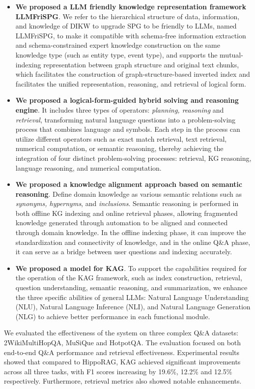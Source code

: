 \documentclass{article}
\begin{document}
   \begin{itemize}
       \item \textbf{We proposed a LLM friendly knowledge representation framework LLMFriSPG}. We refer to the hierarchical structure of data, information, and knowledge of DIKW to upgrade SPG to be friendly to LLMs, named LLMFriSPG, to make it compatible with schema-free information extraction and schema-constrained expert knowledge construction on the same knowledge type (such as entity type, event type), and supports the mutual-indexing representation between graph structure and original text chunks, which facilitates the construction of graph-structure-based inverted index and facilitates the unified representation, reasoning, and retrieval of logical form.
       \item \textbf{We proposed a logical-form-guided hybrid solving and reasoning engine}. It includes three types of operators: \textit{planning, reasoning} and \textit{retrieval}, transforming natural language questions into a problem-solving process that combines language and symbols. Each step in the process can utilize different operators such as exact match retrieval, text retrieval, numerical computation, or semantic reasoning, thereby achieving the integration of four distinct problem-solving processes: retrieval, KG reasoning, language reasoning, and numerical computation.
       \item \textbf{We proposed a knowledge alignment approach based on semantic reasoning}. Define domain knowledge as various semantic relations such as \textit{synonyms, hypernyms}, and \textit{inclusions}. Semantic reasoning is performed in both offline KG indexing and online retrieval phases, allowing fragmented knowledge generated through automation to be aligned and connected through domain knowledge. In the offline indexing phase, it can improve the standardization and connectivity of knowledge, and in the online Q\&A phase, it can serve as a bridge between user questions and indexing accurately.
       \item \textbf{We proposed a model for KAG}. To support the capabilities required for the operation of the KAG framework, such as index construction, retrieval, question understanding, semantic reasoning, and summarization, we enhance the three specific abilities of general LLMs: Natural Language Understanding (NLU), Natural Language Inference (NLI), and Natural Language Generation (NLG) to achieve better performance in each functional module.
   \end{itemize}
We evaluated the effectiveness of the system on three complex Q\&A datasets: 2WikiMultiHopQA\cite{2wiki}, MuSiQue\cite{musique} and HotpotQA\cite{hotpotqa}. The evaluation focused on both end-to-end Q\&A performance and retrieval effectiveness. Experimental results showed that compared to HippoRAG\cite{gutierrez2024hipporag}, KAG achieved significant improvements across all three tasks, with F1 scores increasing by 19.6\%, 12.2\% and 12.5\% respectively. Furthermore, retrieval metrics also showed notable enhancements.
\end{document}
